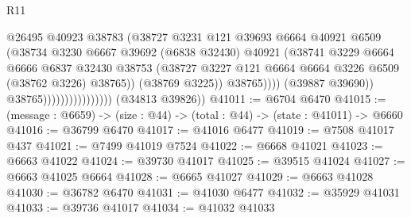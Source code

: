 \begin{lexlean}{R11}
\begin{coremodule}
                                              @26495
                                              @40923
                                              @38783
                                              (@38727
                                                @3231
                                                @121
                                                @39693
                                                @6664
                                                @40921
                                                @6509
                                                (@38734
                                                  @3230
                                                  @6667
                                                  @39692
                                                  (@6838 @32430)
                                                  @40921
                                                  (@38741
                                                    @3229
                                                    @6664
                                                    @6666
                                                    @6837
                                                    @32430
                                                    @38753
                                                    (@38727
                                                      @3227
                                                      @121
                                                      @6664
                                                      @6664
                                                      @3226
                                                      @6509
                                                      (@38762 @3226)
                                                      @38765))
                                                  (@38769 @3225))
                                                @38765))))
                                        (@39887 @39690))
                                      @38765))))))))))))))))
      (@34813 @39826))
@41011 := @6704 @6470
@41015 := (message : @6659) -> (size : @44) -> (total : @44) -> (state : @41011) -> @6660
@41016 := @36799 @6470
@41017 := @41016 @6477
@41019 := @7508 @41017 @437
@41021 := @7499 @41019 @7524
@41022 := @6668 @41021
@41023 := @6663 @41022
@41024 := @39730 @41017
@41025 := @39515 @41024
@41027 := @6663 @41025 @6664
@41028 := @6665 @41027
@41029 := @6663 @41028
@41030 := @36782 @6470
@41031 := @41030 @6477
@41032 := @35929 @41031
@41033 := @39736 @41017
@41034 := @41032 @41033

\end{coremodule}
\end{lexlean}
